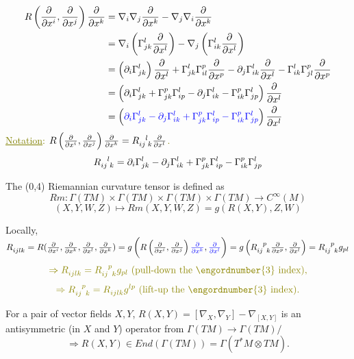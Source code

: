 \begin{align*}
    R\left(\pdv{x^i},\pdv{x^j}\right)\pdv{x^k}&=
    \nabla_i\nabla_j\pdv{x^k}-\nabla_j\nabla_i\pdv{x^k}\\
    &=\nabla_i\left(\Gamma\indices*{_{jk}^l}\pdv{x^l}\right)
    -\nabla_j\left(\Gamma\indices*{_{ik}^l}\pdv{x^l}\right)\\
    &=\left(\partial_i\Gamma\indices*{_{jk}^l}\right)\pdv{x^l}+
    \Gamma\indices*{_{jk}^l}\Gamma\indices*{_{il}^p}\pdv{x^p}
    -\partial_j\Gamma\indices*{_{ik}^l}\pdv{x^l}
    -\Gamma\indices*{_{ik}^l}\Gamma\indices*{_{jl}^p}\pdv{x^p}\\
    &=\left(\partial_i\Gamma\indices*{_{jk}^l}+
    \Gamma\indices*{_{jk}^p}\Gamma\indices*{_{ip}^l}-
    \partial_j\Gamma\indices*{_{ik}^l}-\Gamma\indices*{_{ik}^p}
    \Gamma\indices*{_{jp}^l}\right)\pdv{x^l}\\
    &=\left(\textcolor{blue}{
        \partial_i\Gamma\indices*{_{jk}^l}
        -\partial_j\Gamma\indices*{_{ik}^l}
        +\Gamma\indices*{_{jk}^p}\Gamma\indices*{_{ip}^l}
        -\Gamma\indices*{_{ik}^p}\Gamma\indices*{_{jp}^l}
    }
    \right)\pdv{x^l}
\end{align*}
\textcolor{olive}{
    \underline{Notation}: \(R\left(\pdv{x^i},\pdv{x^j}
    \right)\pdv{x^k}=\tensor{R}{_{ij}^l_k}\pdv{x^l}\).
    \[
        \tensor{R}{_{ij}^l_k}=
        \partial_i\Gamma\indices*{_{jk}^l}
        -\partial_j\Gamma\indices*{_{ik}^l}
        +\Gamma\indices*{_{jk}^p}\Gamma\indices*{_{ip}^l}
        -\Gamma\indices*{_{ik}^p}\Gamma\indices*{_{jp}^l}
    \]
}
\begin{definition}
    The (0,4) Riemannian curvature tensor is defined as 
    \[
        Rm:\Gamma(TM)\times \Gamma(TM)\times\Gamma(TM)\times\Gamma(TM)
        \to C^\infty(M) 
    \]
    \[
        (X,Y,W,Z)\mapsto Rm(X,Y,W,Z)=g\left(R(X,Y),Z,W\right)    
    \]
\end{definition}
Locally, \(\tensor{R}{_{ijlk}}=
R(\pdv{x^i},\pdv{x^k},\pdv{x^l},\pdv{x^k})=
g\left(R\left(\pdv{x^i},\pdv{x^j}\right)\textcolor{blue}{\pdv{x^k}}
,\textcolor{blue}{\pdv{x^l}}\right)=
g\left(\tensor{R}{_{ij}^p_k}\pdv{x^p},\pdv{x^l}\right)=
\tensor{R}{_{ij}^p_k}g_{pl}
\)
\[
    \textcolor{olive}{
        \Rightarrow \tensor{R}{_{ijlk}}=\tensor{R}{_{ij}^p_k}g_{pl}
        \text{ (pull-down the \engordnumber{3} index)},
    }
\]
\[
    \textcolor{olive}{
        \Rightarrow
        \tensor{R}{_{ij}^p_k}=
        \tensor{R}{_{ijlk}} g^{lp}
        \text{ (lift-up the \engordnumber{3} index)}.
    }    
\]
\begin{remark}
    For a pair of vector fields \(X,Y\), \(R(X,Y)=
    \left[\nabla_X,\nabla_Y\right]-\nabla_{[X,Y]}\) is an 
    antisymmetric (in \(X\) and \(Y\)) operator from 
    \(\Gamma(TM)\to \Gamma(TM)/\)
    \[\Rightarrow R(X,Y)\in End \left(\Gamma(TM)\right)=\Gamma
    \left(T^* M\otimes TM\right).\]
\end{remark}

